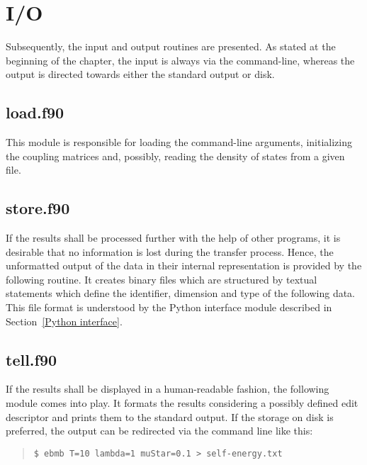 

\section{I/O}

Subsequently, the input and output routines are presented. As stated at the
beginning of the chapter, the input is always via the command-line, whereas the
output is directed towards either the standard output or disk.

\subsection{load.f90}

This module is responsible for loading the command-line arguments, initializing
the coupling matrices and, possibly, reading the density of states from a given
file.



\subsection{store.f90}

If the results shall be processed further with the help of other programs, it is
desirable that no information is lost during the transfer process. Hence, the
unformatted output of the data in their internal representation is provided by
the following routine. It creates binary files which are structured by textual
statements which define the identifier, dimension and type of the following
data. This file format is understood by the Python interface module described in
Section~\ref{Python interface}.



\subsection{tell.f90}

If the results shall be displayed in a human-readable fashion, the following
module comes into play. It formats the results considering a possibly defined
edit descriptor and prints them to the standard output. If the storage on disk
is preferred, the output can be redirected via the command line like this:
%
\begin{quote}
    \verb|$ ebmb T=10 lambda=1 muStar=0.1 > self-energy.txt|
\end{quote}

